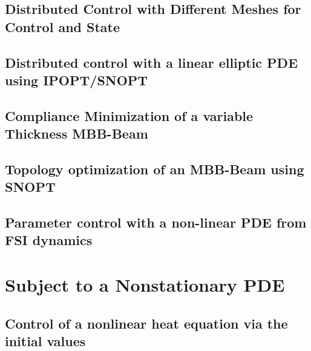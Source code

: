 \documentclass[a4paper,cleardoubleempty]{scrreprt}
\theoremstyle{plain}
\theoremstyle{remark}
\begin{document}
\subsection{Distributed Control with Different Meshes for Control and State}
\label{OPT_Stat_Distributed_MultiMesh}

\clearpage
\subsection{Distributed control with a linear elliptic PDE using IPOPT/SNOPT}
\label{OPT_Stat_Box_controlconstraints_SNOPT}

\clearpage
\subsection{Compliance Minimization of a variable Thickness MBB-Beam}
\label{OPT_Stat_MBB-Beam}

\clearpage
\subsection{Topology optimization of an MBB-Beam using SNOPT}
\label{OPT_Stat_TopOpt_MBB_SNOPT}

\clearpage
\subsection{Parameter control with a non-linear PDE from FSI dynamics}
\label{OPT_Stat_Param_Nonlin_FSI}

\clearpage
\section{Subject to a Nonstationary PDE}
\label{OPT_Instat}
\subsection{Control of a nonlinear heat equation via the initial values}
\label{OPT_Instat initial-value end-time}

\clearpage










\printindex

\end{document}
